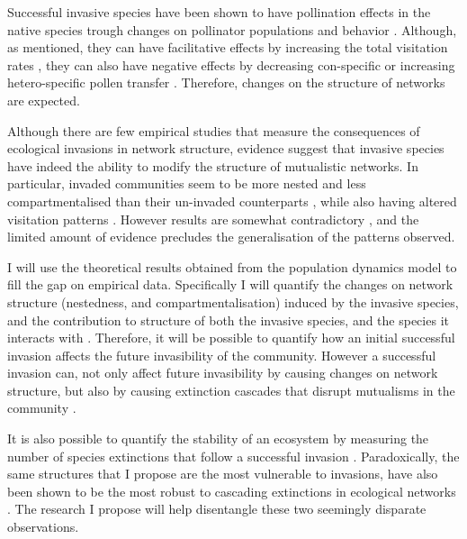 \documentclass[a4paper]{article}
\begin{document}
Successful invasive species have been shown to have pollination effects in the native species trough changes on pollinator populations and behavior \autocite{Christian2001, Bjerknes2007, Morales2009, Vila2009}.
Although, as mentioned, they can have facilitative effects by increasing the total visitation rates \autocite{Bjerknes2007, Sargent2008}, they can also have negative effects by decreasing con-specific or increasing hetero-specific pollen transfer \autocite{Morales2009}.
Therefore, changes on the structure of networks are expected.

Although there are few empirical studies that measure the consequences of ecological invasions in network structure, evidence suggest that invasive species have indeed the ability to modify the structure of mutualistic networks.
In particular, invaded communities seem to be more nested \autocite{Bartomeus2008, Stouffer2014} and less compartmentalised \autocite{Albrecht2014} than their un-invaded counterparts , while also having altered visitation patterns \autocite{Vila2009}.
However results are somewhat contradictory \autocite{Gilberto2012}, and the limited amount of evidence precludes the generalisation of the patterns observed.

I will use the theoretical results obtained from the population dynamics model to fill the gap on empirical data.
Specifically I will quantify the changes on network structure (nestedness, and compartmentalisation) induced by the invasive species, and the contribution to structure of both the invasive species, and the species it interacts with \autocite{Saavedra2011, Stouffer2014}.
Therefore, it will be possible to quantify how an initial successful invasion affects the future invasibility of the community.
However a successful invasion can, not only affect future invasibility by causing changes on network structure, but also by causing extinction cascades that disrupt mutualisms in the community \autocite{Christian2001, RodriguezCabal2013}.

It is also possible to quantify the stability of an ecosystem by measuring the number of species extinctions that follow a successful invasion \autocite{Post1983, Ives2007}.
Paradoxically, the same structures that I propose are the most vulnerable to invasions, have also been shown to be the most robust to cascading extinctions in ecological networks \autocite{Tylianakis2010, Stouffer2011, Albrecht2014}.
The research I propose will help disentangle these two seemingly disparate observations.
\end{document}
